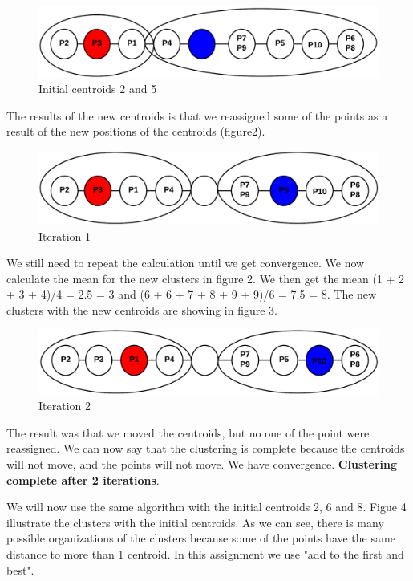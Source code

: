 	\begin{figure}[H]
		\includegraphics[width=\textwidth]{pics/clustering1.png}	
		\caption{Initial centroids 2 and 5}
	\end{figure}

	The results of the new centroids is that we reassigned some of the points
	as a result of the new positions of the centroids (figure2).

	\begin{figure}[H]
		\includegraphics[width=\textwidth]{pics/clustering3.png}	
		\caption{Iteration 1}
	\end{figure}

	We still need to repeat the calculation until we get convergence. We now
	calculate the mean for the new clusters in figure 2. We then get the mean
	(1 + 2 + 3 + 4)/4 = 2.5 = 3 and (6 + 6 + 7 + 8 + 9 + 9)/6 = 7.5 = 8.
	The new clusters with the new centroids are showing in figure 3.


	\begin{figure}[H]
		\includegraphics[width=\textwidth]{pics/clustering5.png}	
		\caption{Iteration 2}
	\end{figure}

	The result was that we moved the centroids, but no one of the point were
	reassigned. We can now say that the clustering is complete because the
	centroids will not move, and the points will not move. We have
	convergence. {\bf Clustering complete after 2 iterations}.

	\clearpage
	We will now use the same algorithm with the initial centroids 2, 6 and 8. 
	Figue 4 illustrate the clusters with the initial centroids. As we can see,
	there is many possible organizations of the clusters because some of the 
	points have the same distance to more than 1 centroid. In this assignment
	we use "add to the first and best". 


